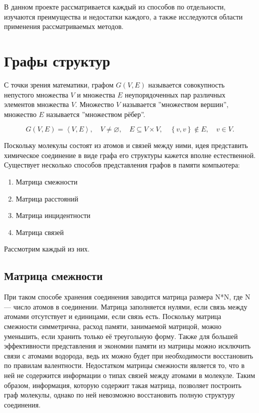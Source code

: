 \documentclass[a4paper,14pt]{extreport}
\begin{document}
В данном проекте рассматривается каждый из способов по отдельности, изучаются преимущества и недостатки каждого, а также исследуются области применения рассматриваемых методов.

  
  
  
  

  
  
  \chapter{Графы структур}
  \label{c:graphs}
  
  С точки зрения математики, графом $G(V,E)$ называется совокупность непустого множества $V$ и множества $E$ неупорядоченных пар различных элементов множества $V$. Множество $V$ называется ''множеством вершин'', множество $E$ называется ''множеством рёбер''.

$$G(V,E) = \left \langle V,E \right \rangle, \quad  V  \ne \varnothing , \quad E \subseteq V \times V , \quad  \left \{ v,v \right \} \notin E, \quad v \in V .$$
  
  Поскольку молекулы состоят из атомов и связей между ними, идея представить химическое соединение в виде графа его структуры кажется вполне естественной. Существует несколько способов представления графов в памяти компьютера:
  \begin{enumerate}
	\item Матрица смежности
	\item Матрица расстояний
	\item Матрица инцидентности
	\item Матрица связей
\end{enumerate}
Рассмотрим каждый из них.
  
  

  \section{Матрица смежности}
  \label{s:matrix_1_sec}
  При таком способе хранения соединения заводится матрица размера N*N, где N — число атомов в соединении. Матрица заполняется нулями, если связь между атомами отсутствует и единицами, если связь есть. Поскольку матрица смежности симметрична, расход памяти, занимаемой матрицой, можно уменьшить, если хранить только её треугольную форму. Также для большей эффективности представления и экономии памяти из матрицы можно исключить связи с атомами водорода, ведь их можно будет при необходимости восстановить по правилам валентности. Недостатком матрицы смежности является то, что в ней не содержится информации о типах связей между атомами в молекуле. Таким образом, информация, которую содержит такая матрица, позволяет построить граф молекулы, однако по ней невозможно восстановить полную структуру соединения.
\end{document}
